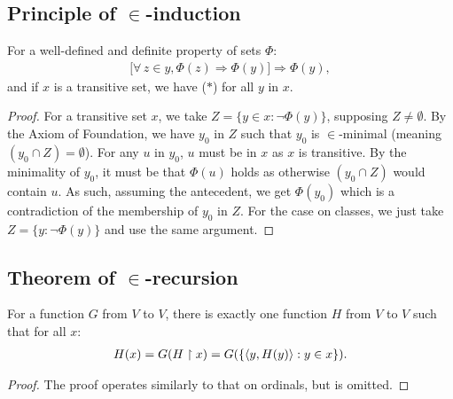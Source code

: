 \subsection{Principle of $\in$-induction} \label{6.7}

For a well-defined and definite property of sets $\Phi$: \begin{align*}
    \bigl[ \forall \, z \in y, \Phi(z) \Longrightarrow \Phi(y) \bigr] 
    \Longrightarrow 
    \Phi(y), \tag{$\ast$}
\end{align*} and if $x$ is a transitive set, we have ($\ast$)
for all $y$ in $x$.

\begin{proof}
    For a transitive set $x$, we take $Z = \{y \in x : \neg \Phi(y)\}$,
    supposing $Z \neq \emptyset$. By the Axiom of Foundation, we 
    have $y_0$ in $Z$ such that $y_0$ is $\in$-minimal
    (meaning $(y_0 \cap Z) = \emptyset$). For any $u$ in $y_0$,
    $u$ must be in $x$ as $x$ is transitive. By the minimality
    of $y_0$, it must be that $\Phi(u)$ holds as otherwise $(y_0 \cap Z)$
    would contain $u$. As such, assuming the antecedent, we get
    $\Phi(y_0)$ which is a contradiction of the membership of $y_0$
    in $Z$. For the case on classes, we just take $Z = \{y : \neg \Phi(y)\}$
    and use the same argument.
\end{proof}

\subsection{Theorem of $\in$-recursion} \label{6.8}

For a function $G$ from $V$ to $V$, there is exactly one function
$H$ from $V$ to $V$ such that for all $x$: \begin{align*}
    H(x) = G(H \upharpoonright x) = G(\{{\langle y, H(y) \rangle} : y \in x\}).
\end{align*}

\begin{proof}
    The proof operates similarly to that on ordinals, but is omitted.
\end{proof}
